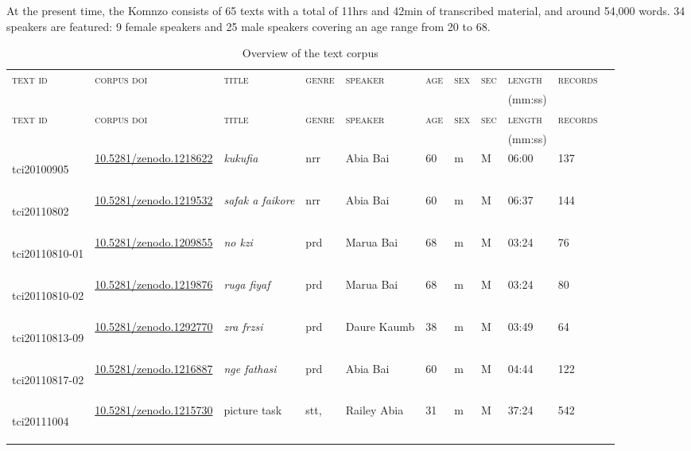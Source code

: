 At the present time, the Komnzo  consists of 65 texts with a total of 11hrs and 42min of transcribed material, and around 54,000 words. 34 speakers are featured: 9 female speakers and 25 male speakers covering an age range from 20 to 68.
\begin{landscape}
	{\renewcommand{\tabcolsep}{3pt}
\begin{longtable}{p{}llllllllll}
\caption[Overview of the text corpus]{Overview of the text corpus}
\label{corpus}\\
	\lsptoprule
	\textsc{text id} & \textsc{corpus doi} & \textsc{title} & \textsc{genre} & \textsc{speaker} & \textsc{age} & \textsc{sex} & \textsc{sec} & \textsc{length} & \textsc{records}\\
	& & & & & & & & (mm:ss) & \\\hline
	\endfirsthead
	\textsc{text id} & \textsc{corpus doi} & \textsc{title} & \textsc{genre} & \textsc{speaker} & \textsc{age} & \textsc{sex} & \textsc{sec} & \textsc{length} & \textsc{records}\\
	& & & & & & & & (mm:ss) & \\\hline
	\endhead
	\hypertarget{tci20100905}{tci20100905} &\href{https://zenodo.org/record/1218622}{10.5281/zenodo.1218622}& \emph{kukufia} & nrr & Abia Bai & 60 & m & M & 06:00 & 137 \\\hline
	\hypertarget{tci20110802}{tci20110802} &\href{https://zenodo.org/record/1219532}{10.5281/zenodo.1219532}& \emph{safak a faikore} & nrr & Abia Bai & 60 & m & M & 06:37 & 144\\\hline
	\hypertarget{tci20110810-01}{tci20110810-01} &\href{https://zenodo.org/record/1209855}{10.5281/zenodo.1209855}& \emph{no kzi} & prd & Marua Bai & 68 & m & M & 03:24 & 76\\\hline
	\hypertarget{tci20110810-02}{tci20110810-02} &\href{https://zenodo.org/record/1219876}{10.5281/zenodo.1219876}& \emph{ruga fiyaf} & prd & Marua Bai & 68 & m & M & 03:24 & 80\\\hline
	\hypertarget{tci20110813-09}{tci20110813-09} &\href{https://zenodo.org/record/1292770}{10.5281/zenodo.1292770}& \emph{zra frzsi} & prd & Daure Kaumb & 38 & m & M & 03:49 & 64\\\hline
	\hypertarget{tci20110817-02}{tci20110817-02} &\href{https://zenodo.org/record/1216887}{10.5281/zenodo.1216887}& \emph{nge fathasi} & prd & Abia Bai & 60 & m & M & 04:44 & 122\\\hline
	\multirow{3}{*}{\hypertarget{tci20111004}{tci20111004}}&\multirow{3}{*}{\href{https://zenodo.org/record/1215730}{10.5281/zenodo.1215730}}& \multirow{3}{*}{picture task} & \multirow{2}{*}{stt,} & Railey Abia & 31 & m & M & \multirow{3}{*}{37:24} & 542\\

\end{longtable}}
\end{landscape}
